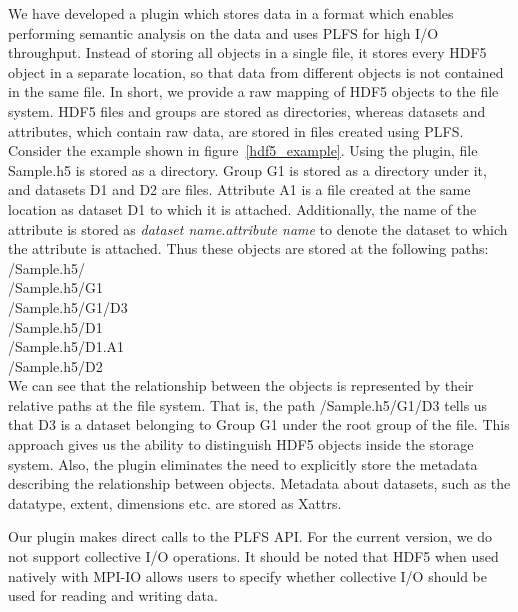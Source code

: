 We have developed a plugin which stores data in a format which enables performing semantic analysis on the data and uses PLFS for high I/O throughput. 
Instead of storing all objects in a single file, it stores every HDF5 object in a separate location, so that data from different objects is not contained in the same file. In short, we provide a raw mapping of HDF5 objects to the file system. 
HDF5 files and groups are stored as directories, whereas datasets and attributes, which contain raw data, are stored in files created using PLFS. 
Consider the example shown in figure~\ref{hdf5_example}. Using the plugin, file Sample.h5 is stored as a directory. Group G1 is stored as a directory under it, and datasets D1 and D2 are files. Attribute A1 is a file created at the same location as dataset D1 to which it is attached. Additionally, the name of the attribute is stored as \textit{dataset name}.\textit{attribute name} to denote the dataset to which the attribute is attached. Thus these objects are stored at the following paths:\\
/Sample.h5/\\
/Sample.h5/G1\\
/Sample.h5/G1/D3\\
/Sample.h5/D1\\
/Sample.h5/D1.A1\\
/Sample.h5/D2\\

We can see that the relationship between the objects is represented by their relative paths at the file system. That is, the path /Sample.h5/G1/D3 tells us that D3 is a dataset belonging to Group G1 under the root group of the file. This approach gives us the ability to distinguish HDF5 objects inside the storage system. Also, the plugin eliminates the need to explicitly store the metadata describing the relationship between objects. Metadata about datasets, such as the datatype, extent, dimensions etc. are stored as Xattrs. 
 


Our plugin makes direct calls to the PLFS API. For the current version, we do not support collective I/O operations. It should be noted that HDF5 when used natively with MPI-IO allows users to specify whether collective I/O should be used for reading and writing data. 

